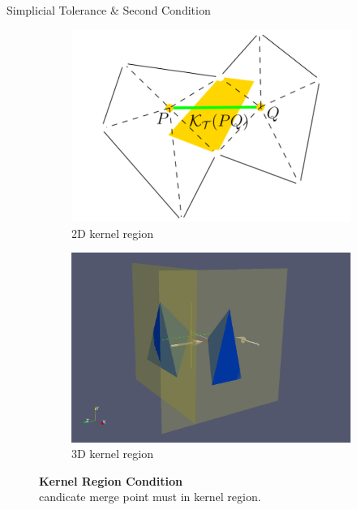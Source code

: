 \documentclass{beamer}
\begin{document}
\begin{frame} {Simplicial Tolerance \& Second Condition}
  \begin{figure}[h]
    \begin{subfigure}[b]{0.4\textwidth}
      \includegraphics[width=\textwidth]{kr0}
      \caption[kr0]{2D kernel region}
    \end{subfigure}
    \begin{subfigure}[b]{0.4\textwidth}
      \includegraphics[width=\textwidth]{kr}
      \caption[kr]{3D kernel region}
    \end{subfigure}
    \caption[krcond]{\textbf{Kernel Region Condition}\\ candicate merge point must in kernel region.}
  \end{figure}
\end{frame}
\end{document}
